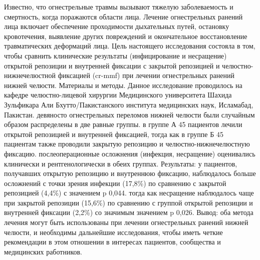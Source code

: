 Известно, что огнестрельные травмы вызывают тяжелую заболеваемость и смертность,
когда поражаются области лица. Лечение огнестрельных ранений лица включает
обеспечение проходимости дыхательных путей, остановку кровотечения, выявление
других повреждений и окончательное восстановление травматических деформаций
лица. Цель настоящего исследования состояла в том, чтобы сравнить клинические
результаты (инфицирование и несращение) открытой репозиции и внутренней фиксации
с закрытой репозицией и челюстно-нижнечелюстной фиксацией (cr-mmf) при лечении
огнестрельных ранений нижней челюсти. Материалы и методы. Данное исследование
проводилось на кафедре челюстно-лицевой хирургии Медицинского университета
Шахида Зульфикара Али Бхутто/Пакистанского института медицинских наук,
Исламабад, Пакистан. девяносто огнестрельных переломов нижней челюсти были
случайным образом распределены в две равные группы. в группе А 45 пациентов
лечили открытой репозицией и внутренней фиксацией, тогда как в группе Б 45
пациентам также проводили закрытую репозицию и челюстно-нижнечелюстную фиксацию.
послеоперационные осложнения (инфекция, несращение) оценивались клинически и
рентгенологически в обеих группах. Результаты: у пациентов, получавших открытую
репозицию и внутреннюю фиксацию, наблюдалось больше осложнений с точки зрения
инфекции (17,8\%) по сравнению с закрытой репозицией (4,4\%) с значением p
0,044.  тогда как несращение наблюдалось чаще при закрытой репозиции (15,6\%) по
сравнению с группой открытой репозиции и внутренней фиксации (2,2\%) со значимым
значением p 0,026. Вывод: оба метода лечения могут быть использованы при лечении
огнестрельных ранений нижней челюсти, и необходимы дальнейшие исследования,
чтобы иметь четкие рекомендации в этом отношении в интересах пациентов,
сообщества и медицинских работников.\cite{muddassar2020}

